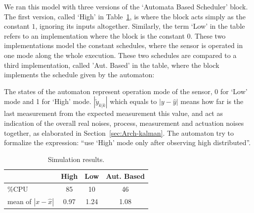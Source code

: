 \documentclass[ twoside, 12pt ]{article}
\begin{document}
We ran this model with three versions of the `Automata Based Scheduler' block. The first version, called `High' in Table~\ref{tbl:sim-results}, is where the block acts simply as the constant $1$, ignoring its inputs altogether. Similarly, the term `Low' in the table refers to an implementation where the block is the constant $0$. These two implementations model the constant schedules, where the sensor is operated in one mode along the whole execution. These two schedules are compared to a third implementation, called 'Aut. Based' in the table, where the block implements the schedule given by the automaton:
\begin{center}
\end{center}
The states of the automaton represent operation mode of the sensor, 0 for `Low' mode and 1 for `High' mode.
$|\tilde{y}_{k|k}|$ which equals to $|y-\hat{y}|$ means how far is the last measurement from the expected measurement this value, and act as indication of the overall real noises, process, measurement and actuation noises together, as elaborated in Section~\ref{sec:Arch-kalman}.
The automaton try to formalize the expression: ``use `High' mode only after observing high distributed''.

%
%

\begin{table}
    \centering
    \begin{tabular}{ |  l  | c | c | c | }
        \hline
        &  High & Low & Aut. Based \\ \hline \hline
        \%CPU                    & 85 & 10  & 46 \\ \hline
        mean of $|x -\hat{x}|$ & 0.97 & 1.24 & 1.08 \\ \hline
    \end{tabular}
    \caption{Simulation results.}
    \label{tbl:sim-results}
\end{table}
\end{document}
